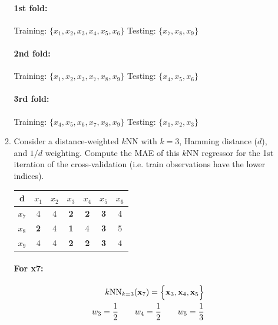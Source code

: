 \documentclass[12pt]{article}
\begin{document}
\begin{enumerate}[leftmargin=\labelsep]
\begin{enumerate}
        \paragraph{1st fold:} Training: $\{x_1, x_2, x_3, x_4, x_5, x_6\}$ Testing: $\{x_7, x_8, x_9\}$
        \paragraph{2nd fold:} Training: $\{x_1, x_2, x_3, x_7, x_8, x_9\}$ Testing: $\{x_4, x_5, x_6\}$
        \paragraph{3rd fold:} Training: $\{x_4, x_5, x_6, x_7, x_8, x_9\}$ Testing: $\{x_1, x_2, x_3\}$
        \item  Consider a distance-weighted $k$NN with $k = 3$, Hamming distance ($d$), and $1/d$ weighting.
        Compute the MAE of this $k$NN regressor for the 1st iteration of the cross-validation (i.e. train
        observations have the lower indices).
        
        \begin{center}
            \begin{tabular}{|c|c|c|c|c|c|c|}
                \hline
                d & $x_1$ & $x_2$ & $x_3$ & $x_4$ & $x_5$ & $x_6$ \\
                \hline
                $x_7$ & 4 & 4 & \textbf{2} & \textbf{2} & \textbf{3} & 4 \\
                \hline
                $x_8$ & \textbf{2} & 4 & \textbf{1} & 4 & \textbf{3} & 5 \\
                \hline
                $x_9$ & 4 & 4 & \textbf{2} & \textbf{2} & \textbf{3} & 4 \\
                \hline
            \end{tabular}
        \end{center}

        \paragraph{For x7:}

        \begin{equation}
        \begin{split}
            k\textrm{NN}_{k = 3}(\mathbf{x}_7) = \Bigl\{ \mathbf{x}_3, \mathbf{x}_4, \mathbf{x}_5\Bigr\} \\
            w_3 = \frac{1}{2} \qquad w_4 = \frac{1}{2} \qquad w_5 = \frac{1}{3}
        \end{split}
        \end{equation}


\end{enumerate}
\end{enumerate}
\end{document}

